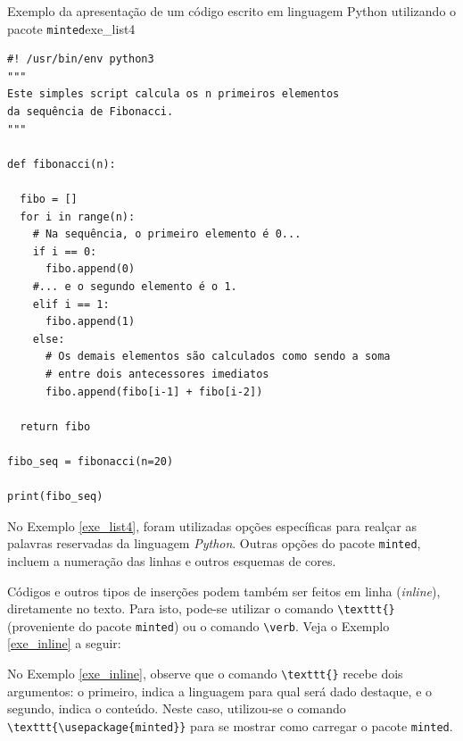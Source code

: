 \begin{texexptitled}[breakable,center lower,enhanced,middle=2mm,leftlower=8mm]{Exemplo da apresentação de um código escrito em linguagem Python utilizando o pacote {\tt minted}}{exe_list4}
\begin{verbatim}
#! /usr/bin/env python3
"""
Este simples script calcula os n primeiros elementos
da sequência de Fibonacci.
"""

def fibonacci(n):

  fibo = []
  for i in range(n):
    # Na sequência, o primeiro elemento é 0...
    if i == 0:
      fibo.append(0)
    #... e o segundo elemento é o 1.
    elif i == 1:
      fibo.append(1)
    else:
      # Os demais elementos são calculados como sendo a soma
      # entre dois antecessores imediatos
      fibo.append(fibo[i-1] + fibo[i-2])

  return fibo

fibo_seq = fibonacci(n=20)

print(fibo_seq)
\end{verbatim}
\end{texexptitled}

No Exemplo \ref{exe_list4}, foram utilizadas opções específicas para realçar as palavras reservadas da linguagem \textit{Python}. Outras opções do pacote {\tt minted}, incluem a numeração das linhas e outros esquemas de cores.

Códigos e outros tipos de inserções podem também ser feitos em linha (\textit{inline}), diretamente no texto. Para isto, pode-se utilizar o comando \verb|\texttt{}| (proveniente do pacote {\tt minted}) ou o comando \verb|\verb|. Veja o Exemplo \ref{exe_inline} a seguir:


No Exemplo \ref{exe_inline}, observe que o comando \verb|\texttt{}| recebe dois argumentos: o primeiro, indica a linguagem para qual será dado destaque, e o segundo, indica o conteúdo. Neste caso, utilizou-se o comando \verb|\texttt{\usepackage{minted}}| para se mostrar como carregar o pacote {\tt minted}.

